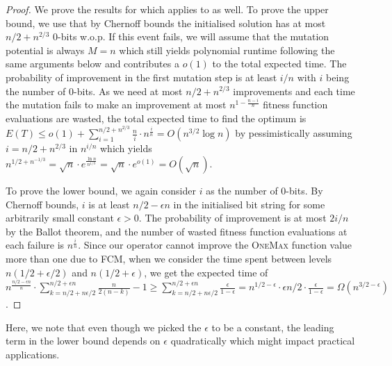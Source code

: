 \documentclass[lettersize,journal]{IEEEtran}
\begin{document}
\begin{proof}
We prove the results for \expoF{} which applies to \expoHD{} as well. 
To prove the upper bound, we use that by Chernoff bounds the initialised solution has at most $n/2+ n^{2/3}$ 0-bits w.o.p. {\color{blue} If this event fails, we will assume that the mutation potential is always $M=n$ which still yields polynomial runtime following the same arguments below and contributes a $o(1)$ to the total expected time}. The probability of improvement in the first mutation step is at least $i/n$ with $i$ being the number of 0-bits. As we need at most $n/2+n^{2/3}$ improvements and each time the mutation fails to make an improvement at most $n^{1-\frac{n-i}{n}}$ fitness function evaluations are wasted, the total expected time to find the optimum is $E(T) \leq o(1) + \sum_{i=1}^{n/2+n^{2/3}} \frac{n}{i} \cdot n^{\frac{i}{n}}= O (n^{3/2} \log n)$ by pessimistically assuming $i=n/2+n^{2/3}$ in $n^{i/n}$ {\color{blue} which yields $n^{1/2+n^{-1/3}}=\sqrt{n} \cdot e^{\frac{\ln n}{n^{1/3}}}=\sqrt{n} \cdot e^{o(1)}=O(\sqrt{n})$}.

To prove the lower bound, we again consider $i$ as the number of 0-bits. By Chernoff 
bounds, $i$ is at least $n/2-\epsilon n$  in the initialised bit string for some arbitrarily small constant $\epsilon>0$. 
The probability of improvement is at most $2i/n$ by the Ballot theorem, and the number of wasted fitness function evaluations at each failure is 
$n^{\frac{i}{n}}$. {\color{blue} Since our operator cannot improve the \textsc{OneMax} function value more than one due to FCM,} when we consider the time spent between levels $n(1/2 + 
\epsilon/2)$ and $n(1/2+\epsilon)$, we get the expected time of 
{\color{blue}$n^{\frac{n/2-\epsilon n}{n}} \cdot \sum_{k=n/2+n\epsilon/2 }^{n/2+\epsilon 
n} \frac{n}{2(n-k)}-1 \geq \sum_{k=n/2+n\epsilon/2 }^{n/2+\epsilon 
n} \frac{\epsilon}{1-\epsilon}=n^{1/2-\epsilon} \cdot \epsilon n/2 \cdot \frac{\epsilon}{1-\epsilon}= 
\Omega(n^{3/2-\epsilon})$.}
\end{proof}

{\color{blue}Here, we note that even though we picked the $\epsilon$ to be a constant, the leading term in the lower bound depends on $\epsilon$ quadratically which might impact practical applications.}



\end{document}
